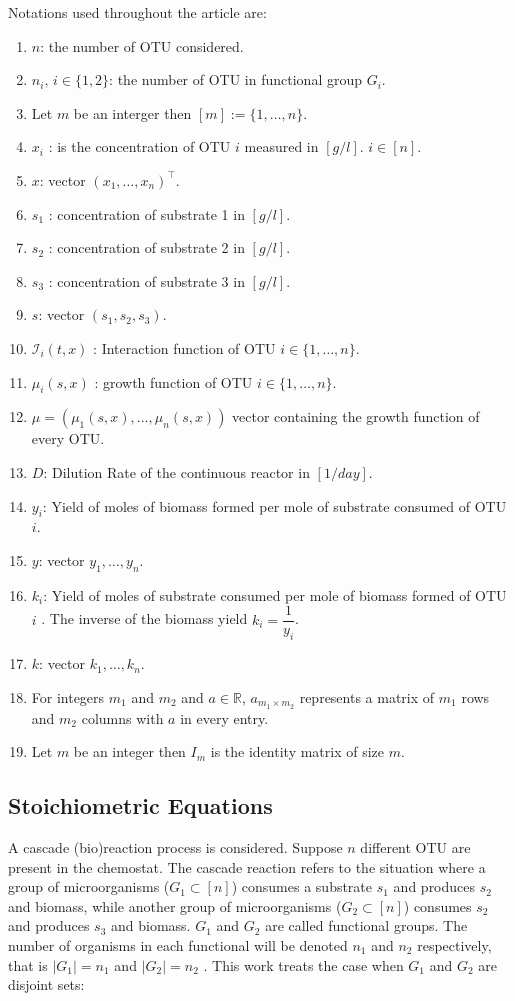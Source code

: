 \documentclass[3p,times]{elsarticle}
\newcommand{\R}{\mathbb{R}}
\newcommand{\I}{\mathcal{I}}
\begin{document}
Notations used throughout the article are:
\begin{enumerate}
	\item $n$: the number of OTU considered.
	\item $n_i, \, i \in \{1,2\}$: the number of OTU in functional group $G_i$.
	\item Let $m$ be an interger then $[m]:=\{1,\dots,n \}$. 
	\item $x_i$ :  is the concentration of OTU $i$ measured in $[g/l]$. $i \in [n]$. 
	\item $x$: vector $(x_1,\dots,x_n)^\top$.
	\item $s_1$ : concentration of substrate 1 in $[g/l]$.
	\item $s_2$ : concentration of substrate 2 in $[g/l]$. 
	\item $s_3$ : concentration of substrate 3 in $[g/l]$.
	\item $s$:  vector $(s_1,s_2,s_3)$.
	\item $\I_i(t,x)$ : Interaction function of OTU $i \in \{1,\dots,n\}$.
	\item $\mu_i(s,x)$ : growth function of OTU $i \in \{1,\dots,n\}$.
	\item $\mu = (\mu_1(s,x), \dots, \mu_n(s,x))$ vector containing the growth function of every OTU.
	\item $D$: Dilution Rate of the continuous reactor in $[1/day]$. 
	\item $y_i$: Yield of moles of biomass formed per mole of substrate consumed of OTU $i$.
	\item $y$: vector $y_1,\dots,y_n$.
	\item $k_i$: Yield of  moles of substrate consumed per mole of biomass formed of OTU $i$ . The inverse of the biomass yield $k_i = \dfrac{1}{y_i}$.
	\item $k$: vector $k_1,\dots,k_n$.
	\item For integers $m_1$ and $m_2$ and $a \in \R$, $a_{m_1 \times m_2}$ represents a matrix of $m_1$ rows and $m_2$ columns with $a$ in every entry. 
	\item Let $m$ be an integer then $I_m$ is the identity matrix of size $m$.
\end{enumerate}

\subsection{Stoichiometric Equations}
A cascade (bio)reaction process is considered. Suppose $n$ different OTU are present in the chemostat. The cascade reaction refers to the situation where a group of microorganisms ($G_1 \subset [n] $) consumes a substrate $s_1$ and produces $s_2$ and biomass, while another group of microorganisms ($G_2\subset [n]$) consumes $s_2$ and produces $s_3$ and biomass. $G_1$ and $G_2$ are called functional groups. The number of organisms in each functional will be denoted $n_1$ and $n_2$ respectively, that is $\vert G_1 \vert = n_1$ and $\vert G_2 \vert = n_2$ . This work treats the case when $G_1$ and $G_2$ are disjoint sets:
\end{document}
